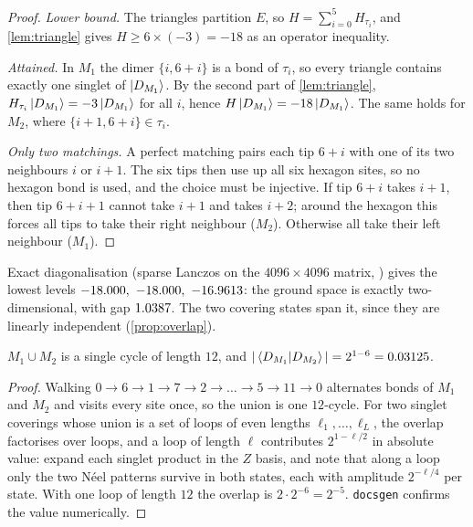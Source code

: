 \begin{proof}
  \emph{Lower bound.} The triangles partition $E$, so $H=\sum_{i=0}^5H_{\tau_i}$, and
  \cref{lem:triangle} gives $H\geq 6\times(-3)=-18$ as an operator inequality.

  \emph{Attained.} In $M_1$ the dimer $\{i,6+i\}$ is a bond of $\tau_i$, so every triangle
  contains exactly one singlet of $\ket{D_{M_1}}$. By the second part of \cref{lem:triangle},
  $H_{\tau_i}\ket{D_{M_1}}=-3\ket{D_{M_1}}$ for all $i$, hence $H\ket{D_{M_1}}=-18\ket{D_{M_1}}$.
  The same holds for $M_2$, where $\{i+1,6+i\}\in\tau_i$.

  \emph{Only two matchings.} A perfect matching pairs each tip $6+i$ with one of its two
  neighbours $i$ or $i+1$. The six tips then use up all six hexagon sites, so no hexagon bond is
  used, and the choice must be injective. If tip $6+i$ takes $i+1$, then tip $6+i+1$ cannot take
  $i+1$ and takes $i+2$; around the hexagon this forces all tips to take their right neighbour
  ($M_2$). Otherwise all take their left neighbour ($M_1$).
\end{proof}

Exact diagonalisation (sparse Lanczos on the $4096\times4096$ matrix, )
gives the lowest levels $\VExactE,\ \VExactEone,\ \VExactEtwo$: the ground space is exactly
two-dimensional, with gap $1.0387$. The two covering states span it, since they are
linearly independent (\cref{prop:overlap}).

\begin{prop}\label{prop:overlap}
  $M_1\cup M_2$ is a single cycle of length $12$, and $|\braket{D_{M_1}}{D_{M_2}}|=2^{1-6}=0.03125$.
\end{prop}

\begin{proof}
  Walking $0\to6\to1\to7\to2\to\dots\to5\to11\to0$ alternates bonds of $M_1$ and $M_2$ and
  visits every site once, so the union is one $12$-cycle. For two singlet coverings whose union
  is a set of loops of even lengths $\ell_1,\dots,\ell_L$, the overlap factorises over loops, and
  a loop of length $\ell$ contributes $2^{1-\ell/2}$ in absolute value: expand each singlet
  product in the $Z$ basis, and note that along a loop only the two N\'eel patterns survive in
  both states, each with amplitude $2^{-\ell/4}$ per state. With one loop of length $12$ the
  overlap is $2\cdot2^{-6}=2^{-5}$. \texttt{docsgen} confirms the value numerically.
\end{proof}

